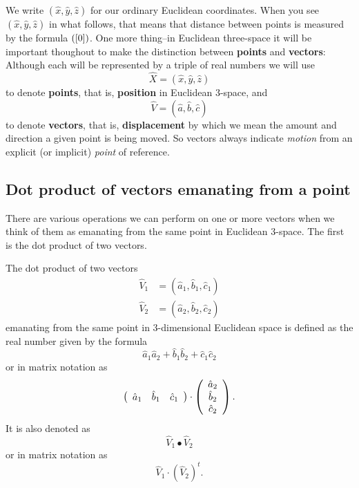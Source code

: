 We write $\left(  \hat{x},\hat{y},\hat{z}\right)  $ for our ordinary Euclidean
coordinates. When you see $\left(  \hat{x},\hat{y},\hat{z}\right)  $ in what
follows, that means that distance between points is measured by the formula
$\left(  \ref{0}\right)  $. One more thing--in Euclidean three-space it will
be important thoughout to make the distinction between \textbf{points} and
\textbf{vectors}: Although each will be represented by a triple of real
numbers we will use%
\[
\hat{X}=\left(  \hat{x},\hat{y},\hat{z}\right)
\]
to denote \textbf{points}, that is, \textbf{position} in Euclidean $3$-space,
and%
\[
\hat{V}=\left(  \hat{a},\hat{b},\hat{c}\right)
\]
to denote \textbf{vectors}, that is, \textbf{displacement} by which we mean
the amount and direction a given point is being moved. So vectors always
indicate \textit{motion} from an explicit (or implicit) \textit{point} of
reference. 

\subsection*{Dot product of vectors emanating from a point}

There are various operations we can perform on one or more vectors when we
think of them as emanating from the same point in Euclidean $3$-space. The
first is the dot product of two vectors.

\begin{definition}
The dot product of two vectors%
\begin{align*}
\hat{V}_{1}  &  =\left(  \hat{a}_{1},\hat{b}_{1},\hat{c}_{1}\right) \\
\hat{V}_{2}  &  =\left(  \hat{a}_{2},\hat{b}_{2},\hat{c}_{2}\right)
\end{align*}
emanating from the same point in 3-dimensional Euclidean space is
defined as the real number given by the formula%
\[
\hat{a}_{1}\hat{a}_{2}+\hat{b}_{1}\hat{b}_{2}+\hat{c}_{1}\hat{c}_{2}%
\]
or in matrix notation as%
\[
\left(
\begin{array}
[c]{ccc}%
\hat{a}_{1} & \hat{b}_{1} & \hat{c}_{1}%
\end{array}
\right)  \cdot\left(
\begin{array}
[c]{c}%
\hat{a}_{2}\\
\hat{b}_{2}\\
\hat{c}_{2}%
\end{array}
\right)  .
\]
It is also denoted as%
\[
\hat{V}_{1}\bullet\hat{V}_{2}%
\]
or in matrix notation as%
\[
\hat{V}_{1}\cdot\left(  \hat{V}_{2}\right)  ^{t}.
\]

\end{definition}

